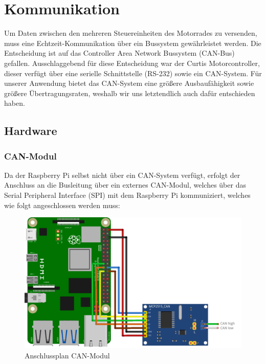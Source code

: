 \newpage


\section{Kommunikation}

Um Daten zwischen den mehreren Steuereinheiten des Motorrades zu versenden, muss eine Echtzeit-Kommunikation über ein Bussystem gewährleistet werden. Die Entscheidung ist auf das Controller Area Network Bussystem (CAN-Bus) gefallen. Ausschlaggebend für diese Entscheidung war der Curtis Motorcontroller, dieser verfügt über eine serielle Schnittstelle (RS-232) sowie ein CAN-System. Für unserer Anwendung bietet das CAN-System eine größere Ausbaufähigkeit sowie größere Übertragungsraten, weshalb wir uns letztendlich auch dafür entschieden haben.

\subsection{Hardware}

\subsubsection{CAN-Modul}

Da der Raspberry Pi selbst nicht über ein CAN-System verfügt, erfolgt der Anschluss an die Busleitung über ein externes CAN-Modul, welches über das Serial Peripheral Interface (SPI) mit dem Raspberry Pi kommuniziert, welches wie folgt angeschlossen werden muss: 

\begin{figure}[H]
	\begin{center}
		\includegraphics[scale=0.9]{figures/hcis/can_module.png}
		\caption{Anschlussplan CAN-Modul}
	\end{center}
\end{figure}

